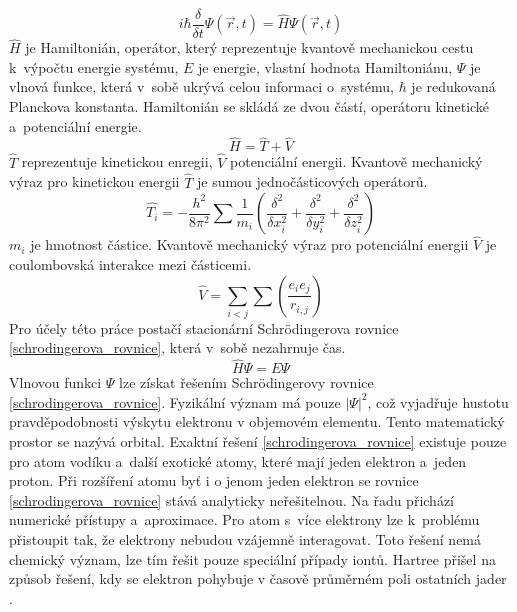 \documentclass[
  printed, %
  table,   %
  lof,     %
  lot,     %
  oneside,
]{fithesis3}
\begin{document}
\begin{equation}
i \hbar \frac{\delta}{\delta t} \Psi (\vec{r},t)=\widehat{H} \Psi(\vec{r},t)
\label{SCH_time_dependent}
\end{equation}
$\widehat{H}$ je Hamiltonián, operátor, který reprezentuje kvantově mechanickou cestu k~výpočtu energie systému, $E$ je energie, vlastní hodnota Hamiltoniánu, $\Psi$ je vlnová funkce, která v~sobě ukrývá celou informaci o~systému, $\hbar$ je redukovaná Planckova konstanta. Hamiltonián se skládá ze dvou částí, operátoru kinetické a~potenciální energie.
\begin{equation}
\widehat{H} = \widehat{T} + \widehat{V}
\end{equation}
$\widehat{T}$ reprezentuje kinetickou enregii, $\widehat{V}$ potenciální energii. Kvantově mechanický výraz pro kinetickou energii $\widehat{T}$ je sumou jednočásticových operátorů. 
\begin{equation}
\widehat{T_i} = - \frac{h^2}{8 \pi ^2} \sum \frac{1}{m_i} \left( \frac{\delta^2}{\delta x_i^2} +\frac{\delta^2}{\delta y_i^2} +\frac{\delta^2}{\delta z_i^2} \right)
\end{equation}
$m_i$ je hmotnost částice. Kvantově mechanický výraz pro potenciální energii $\widehat{V}$ je coulombovská interakce mezi částicemi.
\begin{equation}
\widehat{V} = \sum_{i<j}\sum \left( \frac{e_i e_j}{r_{i,j}}\right)
\end{equation}
 Pro účely této práce postačí stacionární Schrödingerova rovnice \ref{schrodingerova_rovnice}, která v~sobě nezahrnuje čas.\\
 \begin{equation}
\widehat{H}\Psi = E \Psi
\label{schrodingerova_rovnice}
\end{equation}
Vlnovou funkci $\Psi$ lze získat řešením Schrödingerovy rovnice \ref{schrodingerova_rovnice}. Fyzikální význam má pouze $|\Psi|^2$, což vyjadřuje hustotu pravděpodobnosti výskytu elektronu v objemovém elementu. Tento matematický prostor se nazývá orbital. Exaktní řešení \ref{schrodingerova_rovnice} existuje pouze pro atom vodíku a~další exotické atomy, které mají jeden elektron a~jeden proton. Při rozšíření atomu byť i o jenom jeden elektron se rovnice \ref{schrodingerova_rovnice} stává analyticky neřešitelnou. Na řadu přichází numerické přístupy a~aproximace. Pro atom s~více elektrony lze k~problému přistoupit tak, že elektrony nebudou vzájemně interagovat. Toto řešení nemá chemický význam, lze tím řešit pouze speciální případy iontů. Hartree přišel na způsob řešení, kdy se elektron pohybuje v časově průměrném poli ostatních jader \cite{warren1986ab}.
\end{document}
